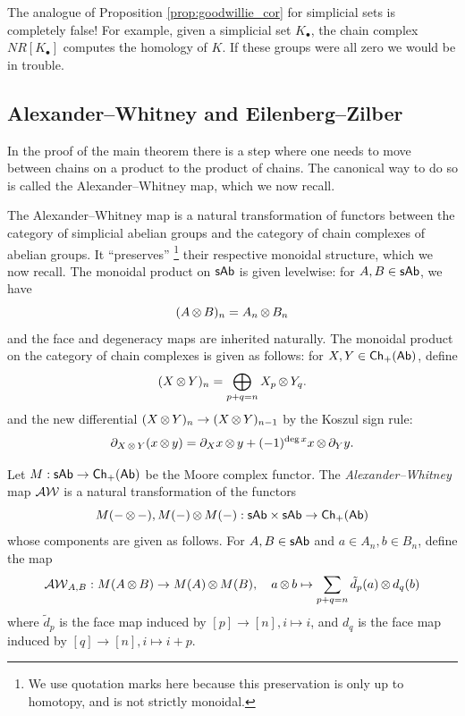 \begin{rem}
  The analogue of Proposition \ref{prop:goodwillie_cor} for simplicial sets is completely false! For example, given a simplicial set $K_\bullet$, the chain complex $NR[K_\bullet]$ computes the homology of $K$. If these groups were all zero we would be in trouble.
\end{rem}

\subsection{Alexander--Whitney and Eilenberg--Zilber}
In the proof of the main theorem there is a step where one needs to move between chains on a product to the product of chains. The canonical way to do so is called the Alexander--Whitney map, which we now recall. 

The Alexander--Whitney map is a natural transformation of functors between the category of simplicial abelian groups and the category of chain complexes of abelian groups. It ``preserves'' \footnote{We use quotation marks here because this preservation is only up to homotopy, and is not strictly monoidal.} their respective monoidal structure, which we now recall. The monoidal product on $\mathsf{sAb}$ is given levelwise: for $A, B\in\mathsf{sAb}$, we have 
\[(A\operatorname{\otimes} B)_n = A_n\operatorname{\otimes} B_n\]
and the face and degeneracy maps are inherited naturally. The monoidal product on the category of chain complexes is given as follows: for $X,Y \in \mathsf{Ch}_+(\mathsf{Ab})$, define 
\[(X\operatorname{\otimes} Y)_n = \bigoplus_{p+q = n} X_p\operatorname{\otimes} Y_q.\]
and the new differential $(X\operatorname{\otimes} Y)_n\to (X\operatorname{\otimes} Y)_{n-1}$ by the Koszul sign rule:
\[\partial_{X\operatorname{\otimes} Y}(x\operatorname{\otimes} y) = \partial_X x\operatorname{\otimes} y + (-1)^{\deg x}x \operatorname{\otimes}\partial_Yy.\] 
\begin{defn}
Let $M: \mathsf{sAb} \to \mathsf{Ch}_{+}(\mathsf{Ab})$ be the Moore complex functor. The \emph{Alexander--Whitney} map $\operatorname{\mathcal{AW}}$ is a natural transformation of the functors 
\[M(-\operatorname{\otimes} -), M(-)\operatorname{\otimes} M(-): \mathsf{sAb}\times \mathsf{sAb} \to \mathsf{Ch}_+(\mathsf{Ab})\]
whose components are given as follows. For $A, B \in \mathsf{sAb}$ and $a \in A_n, b \in B_n$, define the map 
\[\operatorname{\mathcal{AW}}_{A,B}: M(A\operatorname{\otimes} B) \to M(A)\operatorname{\otimes} M(B), \quad a\operatorname{\otimes} b\mapsto \sum_{p+q = n} \tilde{d}_p(a)\operatorname{\otimes} d_q(b)\]
where $\tilde{d}_p$ is the face map induced by $[p]\to [n], i\mapsto i$, and $d_q$ is the face map induced by $[q]\to [n], i \mapsto i+p$. 
\end{defn}


